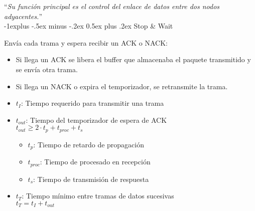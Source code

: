 \documentclass[10pt,landscape]{article}
\makeatletter
\renewcommand{\subsection}{\@startsection{subsection}{2}{0mm}%
                                {-1explus -.5ex minus -.2ex}%
                                {0.5ex plus .2ex}%
                                {\normalfont\normalsize\bfseries}}
\makeatother
\begin{document}
\begin{multicols}{3}
``\textit{Su función principal es el control del enlace de datos entre dos nodos adyacentes.}''\\

\subsection{Stop \& Wait}

Envía cada trama y espera recibir un ACK o NACK:

	\begin{itemize}
		\item Si llega un ACK se libera el buffer que almacenaba el paquete transmitido y se envía otra trama.
		\item Si llega un NACK o expira el temporizador, se retransmite la trama.
	\end{itemize}

\begin{center}
\end{center}


	\begin{itemize}
		\item $t_{I}$: Tiempo requerido para transmitir una trama
		\item $t_{out}$: Tiempo del temporizador de espera de ACK\\
			\qquad $t_{out} \geq 2 \cdot t_{p} + t_{proc} + t_{s}$
			
			\begin{itemize}
				\item $t_{p}$: Tiempo de retardo de propagación
				\item $t_{proc}$: Tiempo de procesado en recepción
				\item $t_{s}$: Tiempo de transmisión de respuesta
			\end{itemize}
		\item $t_{T}$: Tiempo mínimo entre tramas de datos sucesivas \\
			\qquad $t_{T} = t_{I} + t_{out}$
	\end{itemize}


\end{multicols}
\end{document}
